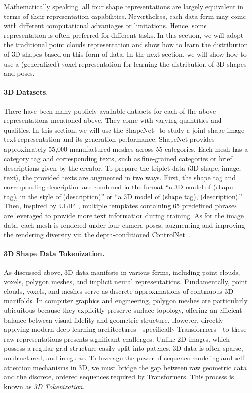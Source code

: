 \documentclass[../../book-main.tex]{subfiles}
\begin{document}
Mathematically speaking, all four shape representations are largely
equivalent in terms of their representation capabilities.
Nevertheless, each data form may come with different computational
advantages or limitations. Hence, some representation is often
preferred for different tasks.
In this section, we will adopt the
traditional point clouds representation and show how to learn the
distribution of 3D shapes based on this form of data.
In the next
section, we will show how to use a (generalized) voxel representation
for learning the distribution of 3D shapes and poses.

\paragraph{3D Datasets.}
There have been many publicly available datasets for each of the
above representations mentioned above.
They come with varying
quantities and qualities. In this section, we will use the
ShapeNet~\citep{chang2015shapenet} to study a joint shape-image-text
representation and its generation performance.
ShapeNet provides
approximately 55,000 manufactured meshes across 55 categories.
Each mesh has a category tag and corresponding texts, such as
fine-grained categories or brief descriptions given by the creator.
To prepare the triplet data (3D shape, image, text), the provided
texts are augmented in two ways.
First, the shape tag and corresponding description are combined in
the format ``a 3D model of (shape tag), in the style of
(description)'' or ``a 3D model of (shape tag), (description).''
Then, inspired by ULIP~\citep{10203465}, multiple templates containing
65 predefined phrases are leveraged to provide more text information
during training.
As for the image data, each mesh is rendered under four camera poses,
augmenting and improving the rendering diversity via the
depth-conditioned ControlNet~\citep{10377881}.

\paragraph{3D Shape Data Tokenization.}
\label{sec:3d_tokenization}
As discussed above, 3D data
manifests in various forms, including point clouds, voxels, polygon
meshes, and implicit neural representations.
Fundamentally, point
clouds, voxels, and meshes serve as discrete approximations of
continuous 3D manifolds.
In computer graphics and engineering,
polygon meshes are particularly ubiquitous because they explicitly
preserve surface topology, offering an efficient balance between
visual fidelity and geometric structure.
However, directly applying modern deep learning
architectures---specifically Transformers---to these raw representations
presents significant challenges.
Unlike 2D images, which possess a
regular grid structure easily split into patches, 3D data is often
sparse, unstructured, and irregular.
To leverage the power of
sequence modeling and self-attention mechanisms in 3D, we must bridge
the gap between raw geometric data and the discrete, ordered
sequences required by Transformers.
This process is known as
\textit{3D Tokenization}.
\end{document}
